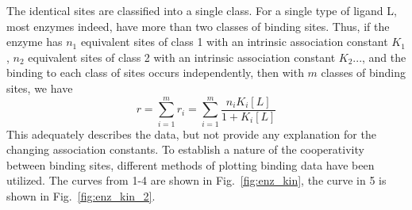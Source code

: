 The identical sites are classified into a single class. For a single
type of ligand L, most enzymes indeed, have more than two classes of
binding sites. Thus, if the enzyme has $n_1$ equivalent sites of class
1 with an intrinsic association constant $K_1$, $n_2$ equivalent sites
of class 2 with an intrinsic association constant $K_2$..., and the
binding to each class of sites occurs independently, then with $m$
classes of binding sites, we have
\begin{equation}
  \label{eq:317}
  r = \sum_{i=1}^m r_i = \sum_{i=1}^m \frac{n_iK_i[L]}{1+K_i[L]}  
\end{equation}
This adequately describes the data, but not provide any explanation
for the changing association constants. To establish a nature of the
cooperativity between binding sites, different methods of plotting
binding data have been utilized. The curves from 1-4 are shown in
Fig.~\ref{fig:enz_kin}, the curve in 5 is shown in
Fig.~\ref{fig:enz_kin_2}.
